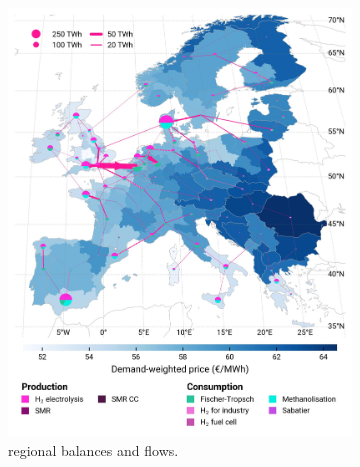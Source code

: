 \documentclass[preprint,12pt,sort&compress]{elsarticle}
\begin{document}
\begin{figure}[htbp]
  \centering
  \begin{subfigure}[t]{0.49\textwidth}
      \vspace{0pt}
      \includegraphics[width=1\textwidth]{maps/greenfield-pipelines/base_s_adm___2050-balance_map_H2}
      \vspace{-0.5cm}
      \caption{ regional balances and flows.}
      \label{fig:CP_lt_2050_h2}
  \end{subfigure}
  \hfill
  \begin{subfigure}[t]{0.49\textwidth}
      \vspace{0pt}

\end{subfigure}
\end{figure}
\end{document}
